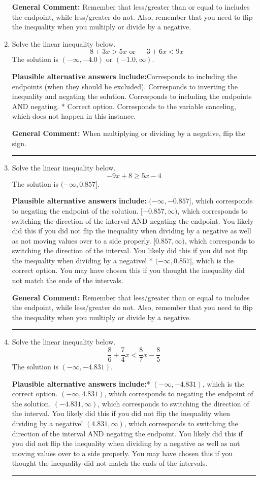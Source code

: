 \documentclass{extbook}[14pt]
\newcommand{\litem}[1]{\item #1

\rule{\textwidth}{0.4pt}}
\begin{document}
\begin{enumerate}
{\textbf{General Comment:} Remember that less/greater than or equal to includes the endpoint, while less/greater do not. Also, remember that you need to flip the inequality when you multiply or divide by a negative.
}
\litem{
Solve the linear inequality below.
\[ -8 + 3 x > 5 x \text{ or } -3 + 6 x < 9 x \]The solution is \( (-\infty, -4.0) \text{ or } (-1.0, \infty) \).\begin{enumerate}[label=\Alph*.]
\textbf{Plausible alternative answers include:}Corresponds to including the endpoints (when they should be excluded).
Corresponds to inverting the inequality and negating the solution.
Corresponds to including the endpoints AND negating.
 * Correct option.
Corresponds to the variable canceling, which does not happen in this instance.
\end{enumerate}

\textbf{General Comment:} When multiplying or dividing by a negative, flip the sign.
}
\litem{
Solve the linear inequality below.
\[ -9x + 8 \geq 5x -4 \]The solution is \( (-\infty, 0.857] \).\begin{enumerate}[label=\Alph*.]
\textbf{Plausible alternative answers include:} $(-\infty, -0.857]$, which corresponds to negating the endpoint of the solution.
 $[-0.857, \infty)$, which corresponds to switching the direction of the interval AND negating the endpoint. You likely did this if you did not flip the inequality when dividing by a negative as well as not moving values over to a side properly.
 $[0.857, \infty)$, which corresponds to switching the direction of the interval. You likely did this if you did not flip the inequality when dividing by a negative!
* $(-\infty, 0.857]$, which is the correct option.
You may have chosen this if you thought the inequality did not match the ends of the intervals.
\end{enumerate}

\textbf{General Comment:} Remember that less/greater than or equal to includes the endpoint, while less/greater do not. Also, remember that you need to flip the inequality when you multiply or divide by a negative.
}
\litem{
Solve the linear inequality below.
\[ \frac{8}{6} + \frac{7}{4} x < \frac{8}{7} x - \frac{8}{5} \]The solution is \( (-\infty, -4.831) \).\begin{enumerate}[label=\Alph*.]
\textbf{Plausible alternative answers include:}* $(-\infty, -4.831)$, which is the correct option.
 $(-\infty, 4.831)$, which corresponds to negating the endpoint of the solution.
 $(-4.831, \infty)$, which corresponds to switching the direction of the interval. You likely did this if you did not flip the inequality when dividing by a negative!
 $(4.831, \infty)$, which corresponds to switching the direction of the interval AND negating the endpoint. You likely did this if you did not flip the inequality when dividing by a negative as well as not moving values over to a side properly.
You may have chosen this if you thought the inequality did not match the ends of the intervals.
\end{enumerate}

}
\end{enumerate}
\end{document}
